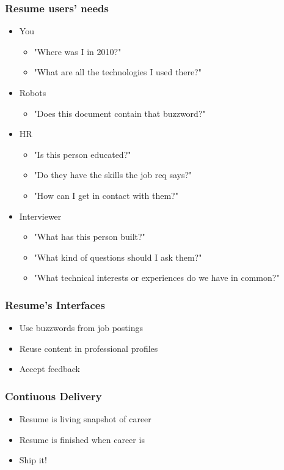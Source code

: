 \documentclass{beamer}
\begin{document}
\begin{frame}
 \frametitle{Resume users' needs}



\begin{itemize}
  \item You
\begin{itemize}
  \item "Where was I in 2010?"
  \item "What are all the technologies I used there?"
\end{itemize}
  \item Robots
\begin{itemize}
  \item "Does this document contain that buzzword?"
\end{itemize}
  \item HR
\begin{itemize}
  \item "Is this person educated?"
  \item "Do they have the skills the job req says?"
  \item "How can I get in contact with them?"
\end{itemize}
  \item Interviewer
\begin{itemize}
  \item "What has this person built?"
  \item "What kind of questions should I ask them?"
  \item "What technical interests or experiences do we have in common?"
\end{itemize}
\end{itemize}


\end{frame}
\begin{frame}
 \frametitle{Resume's Interfaces}



\begin{itemize}
  \item Use buzzwords from job postings
  \item Reuse content in professional profiles
  \item Accept feedback
\end{itemize}


\end{frame}
\begin{frame}
 \frametitle{Contiuous Delivery}



\begin{itemize}
  \item Resume is living snapshot of career
  \item Resume is finished when career is
  \item Ship it!
\end{itemize}


\end{frame}
\end{document}
